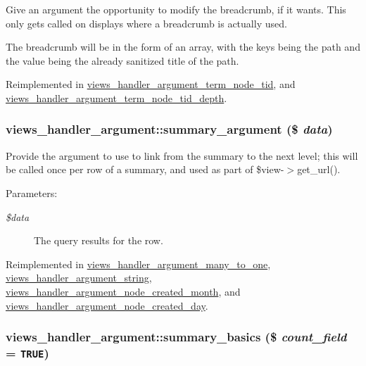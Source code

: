 Give an argument the opportunity to modify the breadcrumb, if it wants. This only gets called on displays where a breadcrumb is actually used.

The breadcrumb will be in the form of an array, with the keys being the path and the value being the already sanitized title of the path. 

Reimplemented in \hyperlink{classviews__handler__argument__term__node__tid_ef9753aafd176e2e63c4a99be1177175}{views\_\-handler\_\-argument\_\-term\_\-node\_\-tid}, and \hyperlink{classviews__handler__argument__term__node__tid__depth_4cbf578a06b12655b9a5aa8fcee4097d}{views\_\-handler\_\-argument\_\-term\_\-node\_\-tid\_\-depth}.\hypertarget{classviews__handler__argument_ad03acefdb44288d7e6c7793bc33f66c}{
\subsubsection[{summary\_\-argument}]{\setlength{\rightskip}{0pt plus 5cm}views\_\-handler\_\-argument::summary\_\-argument (\$ {\em data})}}
\label{classviews__handler__argument_ad03acefdb44288d7e6c7793bc33f66c}


Provide the argument to use to link from the summary to the next level; this will be called once per row of a summary, and used as part of \$view-$>$get\_\-url().

\begin{Desc}
\item[Parameters:]
\begin{description}
\item[{\em \$data}]The query results for the row. \end{description}
\end{Desc}


Reimplemented in \hyperlink{classviews__handler__argument__many__to__one_94fb0499ff1078d0423de06d33e898a5}{views\_\-handler\_\-argument\_\-many\_\-to\_\-one}, \hyperlink{classviews__handler__argument__string_185c0d31b97f98df85073d53b3f8c26d}{views\_\-handler\_\-argument\_\-string}, \hyperlink{classviews__handler__argument__node__created__month_4ecc9b35ee8ae4e8d61d18e83f1dfe82}{views\_\-handler\_\-argument\_\-node\_\-created\_\-month}, and \hyperlink{classviews__handler__argument__node__created__day_c7f626914f87a04112962bf39d49d454}{views\_\-handler\_\-argument\_\-node\_\-created\_\-day}.\hypertarget{classviews__handler__argument_a5fe1eefd53a7ee6438b34c8cdbb1aec}{
\subsubsection[{summary\_\-basics}]{\setlength{\rightskip}{0pt plus 5cm}views\_\-handler\_\-argument::summary\_\-basics (\$ {\em count\_\-field} = {\tt TRUE})}}
\label{classviews__handler__argument_a5fe1eefd53a7ee6438b34c8cdbb1aec}



